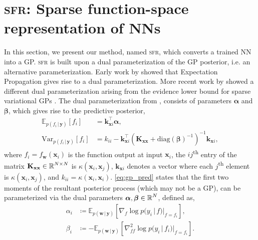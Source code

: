 \documentclass{article}
\renewcommand{\paragraph}[1]{{\bf #1}~~}
\newcommand{\our}{\textsc{sfr}\xspace}
\newcommand{\mathbold}[1]{\bm{#1}}
\newcommand{\mbf}[1]{\mathbf{#1}}
\renewcommand{\mid}{\,|\,}
\newcommand{\valpha}[0]{\mathbold{\alpha}}
\newcommand{\vbeta}[0]{\mathbold{\beta}}
\newcommand{\diag}{\text{{diag}}}
\newcommand{\vx}{\mbf{x}}
\newcommand{\vy}{\mbf{y}}
\newcommand{\vw}{\mbf{w}}
\newcommand{\MKxx}{\mbf{K}_{\mbf{x}\mbf{x}}}
\newcommand{\vk}{\mbf{k}}
\newcommand{\myexpect}{\mathbb{E}}
\begin{document}
\section{\our: Sparse function-space representation of NNs}\label{sec:sfr}
In this section, we present our method, named \our, which converts a trained NN into a GP.
\our is built upon a dual parameterization of the GP posterior, i.e. an alternative parameterization.
Early work by \citet{csato2002sparse} showed that Expectation Propagation gives rise to a dual parameterization.
More recent work by \citet{adam2021dual,chang2023memory} showed a different dual parameterization arising from the evidence lower bound for sparse variational GPs \citep{hensman2013gaussian,titsias2009variational}.
The dual parameterization from \citet{adam2021dual,chang2023memory}, consists of parameters $\valpha$ and $\vbeta$, which gives rise to the predictive posterior,
\begin{subequations}  \label{eq:gp_pred}
\begin{align}
  \myexpect_{p(f_i \mid\vy)}[f_i] &= \vk_{\vx i}^\top \valpha, \\
  \mathrm{Var}_{p(f_i \mid \vy)}[f_i] &= k_{ii} - \vk_{\vx i}^\top ( \MKxx + \diag(\vbeta)^{-1})^{-1} \vk_{\vx i},  \nonumber
\end{align}
\end{subequations}
%
where $f_i = f_\vw(\vx_i)$ is the function output at input $\vx_i$,
the $ij$\textsuperscript{th} entry of the matrix $\MKxx \in \R^{N \times N}$ is $\kappa(\vx_i,\vx_j)$, $\vk_{\vx i}$ denotes a vector where each $j$\textsuperscript{th} element is $\kappa(\vx_i, \vx_j)$, and $k_{ii} = \kappa(\vx_i, \vx_i)$.
\cref{eq:gp_pred} states that the first two moments of the resultant posterior process (which may not be a GP), can be parameterized via the dual
parameters $\valpha, \vbeta \in \R^{N}$,
defined as, 
%
\begin{subequations}
\label{eq:dual_param}
\begin{align}
  \alpha_i &\coloneqq \myexpect_{p(\vw \mid \vy)}[\nabla_{f}\log p(y_i \mid f) |_{f=f_i}], \\
  \beta_i &\coloneqq - \myexpect_{p(\vw \mid \vy)}[\nabla^2_{f f}\log p(y_i \mid f_i) |_{f=f_i}].
  \end{align}
\end{subequations}
\end{document}
